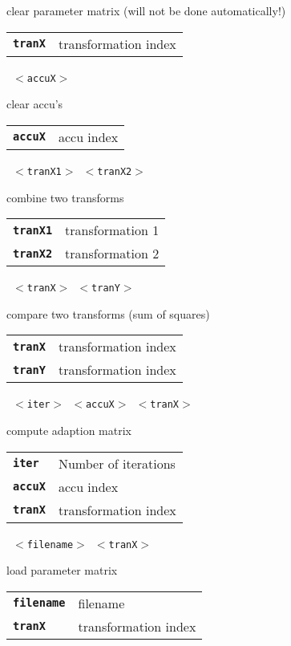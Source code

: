 \begin{description}
\begin{description}
        clear parameter matrix (will not be done automatically!)

      \begin{tabular}{ll}
 \texttt{\textbf{tranX}} &  transformation index  \\
      \end{tabular}
       \texttt{ $<$accuX$>$} \

        clear accu's

      \begin{tabular}{ll}
 \texttt{\textbf{accuX}} &  accu index  \\
      \end{tabular}
       \texttt{ $<$tranX1$>$ $<$tranX2$>$} \

        combine two transforms

      \begin{tabular}{ll}
 \texttt{\textbf{tranX1}} &  transformation 1  \\
 \texttt{\textbf{tranX2}} &  transformation 2  \\
      \end{tabular}
       \texttt{ $<$tranX$>$ $<$tranY$>$} \

        compare two transforms (sum of squares)

      \begin{tabular}{ll}
 \texttt{\textbf{tranX}} &  transformation index  \\
 \texttt{\textbf{tranY}} &  transformation index  \\
      \end{tabular}
       \texttt{ $<$iter$>$ $<$accuX$>$ $<$tranX$>$} \

        compute adaption matrix

      \begin{tabular}{ll}
 \texttt{\textbf{iter}} &   Number of iterations  \\
 \texttt{\textbf{accuX}} &  accu index  \\
 \texttt{\textbf{tranX}} &  transformation index  \\
      \end{tabular}
       \texttt{ $<$filename$>$ $<$tranX$>$} \

        load parameter matrix

      \begin{tabular}{ll}
 \texttt{\textbf{filename}} &  filename  \\
 \texttt{\textbf{tranX}} &     transformation index  \\
      \end{tabular}
       \texttt{} \


\end{description}
\end{description}

